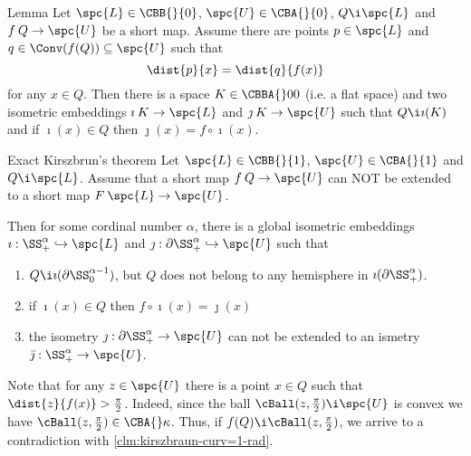 {\begin{thm}{Lemma}
Let $\spc{L}\in \CBB{}{0}$, 
$\spc{U}\in \CBA{}{0}$, 
$Q\i \spc{L}$ 
and $f\:Q\to \spc{U}$ be a short map.
Assume there are points $p\in \spc{L}$ and $q\in\Conv(f(Q))\subseteq \spc{U}$ such that 
$$\dist{p}{x}=\dist{q}{f(x)}$$
for any $x\in Q$.
Then there is a space $K\in \CBBA{}00$ (i.e. a flat space) and two isometric embeddings $\imath\:K\to \spc{L}$ and $\jmath\:K\to \spc{U}$ such that
$Q\i \imath(K)$ and if $\imath(x)\in Q$ then $\jmath(x)=f\circ\imath(x)$.
\end{thm}























\begin{thm}{Exact Kirszbrun's theorem}\label{clm:kirszbraun-curv=1}
Let $\spc{L}\in\CBB{}{1}$, 
$\spc{U}\in\CBA{}{1}$ 
and $Q\i \spc{L}$.
Assume that a short map $f\:Q\to \spc{U}$ can NOT be extended to a short map 
$F\:\spc{L}\to \spc{U}$.

Then for some cordinal number $\alpha$, there is a global isometric embeddings $\imath:\SS^\alpha_+\hookrightarrow \spc{L}$ and $\jmath:\partial\SS^\alpha_+\hookrightarrow \spc{U}$ such that
\begin{enumerate}
\item $Q\i \imath(\partial\SS^{\alpha-1}_0)$, but $Q$ does not belong to any hemisphere in $\imath(\partial\SS^{\alpha}_+)$.
\item if $\imath(x)\in Q$ then $f\circ\imath(x)=\jmath(x)$ 
\item the isometry $\jmath:\partial\SS^\alpha_+\to \spc{U}$ can not be extended to an ismetry $\bar\jmath:\SS^\alpha_+\to \spc{U}$.
\end{enumerate}
\end{thm}

 Note that for any $z\in \spc{U}$ there is a point $x\in Q$ such that $\dist{z}{f(x)}>\tfrac\pi2$.
Indeed, since the ball $\cBall(z,\tfrac\pi2)\i \spc{U}$ is convex we have $\cBall(z,\tfrac\pi2)\in \CBA{}\kappa$.
Thus, if $f(Q)\i \cBall(z,\tfrac\pi2)$, we arrive to a contradiction with \ref{clm:kirszbraun-curv=1-rad}.

}
